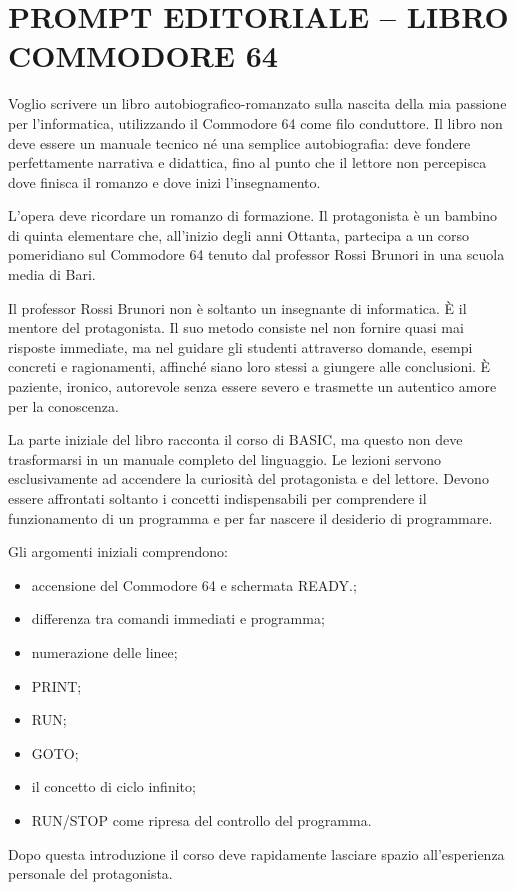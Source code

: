 \documentclass{article}
\author{HP}
\date{2026-07-26}
\begin{document}
\section{PROMPT EDITORIALE – LIBRO {\textquotedbl}COMMODORE 64{\textquotedbl}}
Voglio scrivere un libro autobiografico-romanzato sulla nascita della mia passione per l'informatica, utilizzando il
Commodore 64 come filo conduttore. Il libro non deve essere un manuale tecnico né una semplice autobiografia: deve
fondere perfettamente narrativa e didattica, fino al punto che il lettore non percepisca dove finisca il romanzo e dove
inizi l'insegnamento.

L'opera deve ricordare un romanzo di formazione. Il protagonista è un bambino di quinta elementare che, all'inizio degli
anni Ottanta, partecipa a un corso pomeridiano sul Commodore 64 tenuto dal professor Rossi Brunori in una scuola media
di Bari.

Il professor Rossi Brunori non è soltanto un insegnante di informatica. È il mentore del protagonista. Il suo metodo
consiste nel non fornire quasi mai risposte immediate, ma nel guidare gli studenti attraverso domande, esempi concreti
e ragionamenti, affinché siano loro stessi a giungere alle conclusioni. È paziente, ironico, autorevole senza essere
severo e trasmette un autentico amore per la conoscenza.

La parte iniziale del libro racconta il corso di BASIC, ma questo non deve trasformarsi in un manuale completo del
linguaggio. Le lezioni servono esclusivamente ad accendere la curiosità del protagonista e del lettore. Devono essere
affrontati soltanto i concetti indispensabili per comprendere il funzionamento di un programma e per far nascere il
desiderio di programmare.

Gli argomenti iniziali comprendono:

\begin{itemize}
\item accensione del Commodore 64 e schermata READY.; 
\item differenza tra comandi immediati e programma; 
\item numerazione delle linee; 
\item PRINT; 
\item RUN; 
\item GOTO; 
\item il concetto di ciclo infinito; 
\item RUN/STOP come ripresa del controllo del programma. 
\end{itemize}
Dopo questa introduzione il corso deve rapidamente lasciare spazio all'esperienza personale del protagonista.
\end{document}
